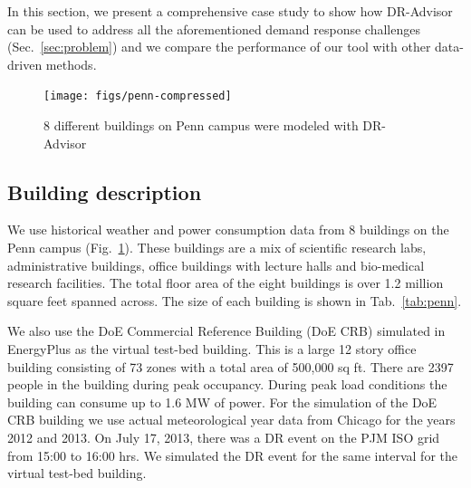 
In this section, we present a comprehensive case study to show how DR-Advisor can be used to address all the aforementioned demand response challenges (Sec.~\ref{sec:problem}) and we compare the performance of our tool with other data-driven methods. 

\begin{figure}
\centering
\texttt{[image: figs/penn-compressed]}
\caption{8 different buildings on Penn campus were modeled with DR-Advisor}
\label{fig:penn}
\end{figure}

\subsection{Building description}
We use historical weather and power consumption data from 8 buildings on the Penn campus (Fig.~\ref{fig:penn}). These buildings are a mix of scientific research labs, administrative buildings, office buildings with lecture halls and bio-medical research facilities. The total floor area of the eight buildings is over 1.2 million square feet spanned across. The size of each building is shown in Tab.~\ref{tab:penn}.

We also use the DoE Commercial Reference Building (DoE CRB) simulated in EnergyPlus as the virtual test-bed building.
This is a large 12 story office building consisting of 73 zones with a total area of 500,000 sq ft. 
There are 2397 people in the building during peak occupancy. 
During peak load conditions the building can consume up to 1.6 MW of power. 
For the simulation of the DoE CRB building we use actual meteorological year data from Chicago for the years 2012 and 2013. 
On July 17, 2013, there was a DR event on the PJM ISO grid from 15:00 to 16:00 hrs. We simulated the DR event for the same interval for the virtual test-bed building.

